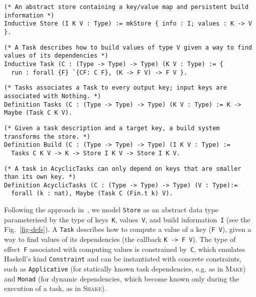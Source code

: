 \documentclass[sigplan,review]{acmart}\settopmatter{printfolios=true,printccs=false,printacmref=false}
\newcommand{\hs}{\texttt}
\newcommand{\Make}{\textsc{Make}\xspace}
\newcommand{\Shake}{\textsc{Shake}\xspace}
\begin{document}
\begin{figure*}[t]
\begin{verbatim}
(* An abstract store containing a key/value map and persistent build information *)
Inductive Store (I K V : Type) := mkStore { info : I; values : K -> V }.
\end{verbatim}
\vspace{-1mm}
\begin{verbatim}
(* A Task describes how to build values of type V given a way to find values of its dependencies *)
Inductive Task (C : (Type -> Type) -> Type) (K V : Type) := {
  run : forall {F} `{CF: C F}, (K -> F V) -> F V }.
\end{verbatim}
\vspace{-1mm}
\begin{verbatim}
(* Tasks associates a Task to every output key; input keys are associated with Nothing. *)
Definition Tasks (C : (Type -> Type) -> Type) (K V : Type) := K -> Maybe (Task C K V).
\end{verbatim}
\vspace{-1mm}
\begin{verbatim}
(* Given a task description and a target key, a build system transforms the store. *)
Definition Build (C : (Type -> Type) -> Type) (I K V : Type) :=
  Tasks C K V -> K -> Store I K V -> Store I K V.
\end{verbatim}
\vspace{-1mm}
\begin{verbatim}
(* A task in AcyclicTasks can only depend on keys that are smaller than its own key. *)
Definition AcyclicTasks (C : (Type -> Type) -> Type) (V : Type):=
  forall (k : nat), Maybe (Task C (Fin.t k) V).
\end{verbatim}
\vspace{-4mm}
\caption{Build system abstractions in Coq.}\label{fig-defs}
\vspace{-4mm}
\end{figure*}

Following the approach in~\cite{Mokhov2018icfp}, we model \hs{Store} as
an abstract data type parameterised by the type of keys~\hs{K}, values~\hs{V},
and build information~\hs{I} (see the Fig.~\ref{fig-defs}). A \hs{Task}
describes how to compute a value of a key (\hs{F V}), given a way to find values
of its dependencies (the callback \hs{K -> F V}). The type of effect~\hs{F}
associated with computing values is constrained by~\hs{C}, which emulates
Haskell's kind \hs{Constraint} and can be instantiated with concrete constraints,
such as \hs{Applicative} (for statically known task dependencies, e.g. as in \Make)
and \hs{Monad} (for dynamic dependencies, which become known only during the
execution of a task, as in \Shake).
\end{document}
